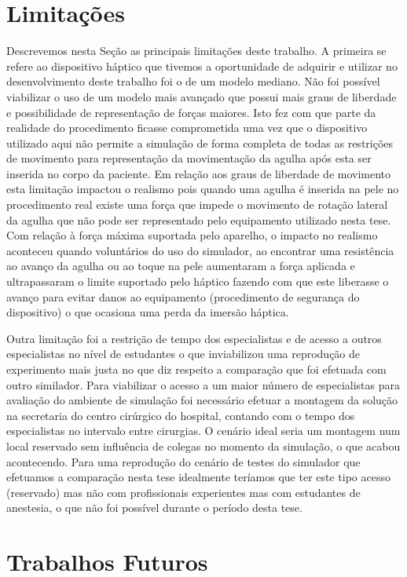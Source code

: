 \section{Limitações}

Descrevemos nesta Seção as principais limitações deste trabalho. A primeira se refere ao dispositivo háptico que tivemos a oportunidade de adquirir e utilizar no desenvolvimento deste trabalho foi o de um modelo mediano. Não foi possível viabilizar o uso de um modelo mais avançado que possui mais graus de liberdade e possibilidade de representação de forças maiores. Isto fez com que parte da realidade do procedimento ficasse comprometida uma vez que o dispositivo utilizado aqui não permite a simulação de forma completa de todas as restrições de movimento para representação da movimentação da agulha após esta ser inserida no corpo da paciente. Em relação aos graus de liberdade de movimento esta limitação impactou o realismo pois quando uma agulha é inserida na pele no procedimento real existe uma força que impede o movimento de rotação lateral da agulha que não pode ser representado pelo equipamento utilizado nesta tese. Com relação à força máxima suportada pelo aparelho, o impacto no realismo aconteceu quando voluntários do uso do simulador, ao encontrar uma resistência ao avanço da agulha ou ao toque na pele aumentaram a força aplicada e ultrapassaram o limite suportado pelo háptico fazendo com que este liberasse o avanço para evitar danos ao equipamento (procedimento de segurança do dispositivo) o que ocasiona uma perda da imersão háptica.   

Outra limitação foi a restrição de tempo dos especialistas e de acesso a outros especialistas no nível de estudantes o que inviabilizou uma reprodução de experimento mais justa no que diz respeito a comparação que foi efetuada com outro similador. Para viabilizar o acesso a um maior número de especialistas para avaliação do ambiente de simulação foi necessário efetuar a montagem da solução na secretaria do centro cirúrgico do hospital, contando com o tempo dos especialistas no intervalo entre cirurgias. O cenário ideal seria um montagem num local reservado sem influência de colegas no momento da simulação, o que acabou acontecendo. Para uma reprodução do cenário de testes do simulador que efetuamos a comparação nesta tese idealmente teríamos que ter este tipo acesso (reservado) mas não com profissionais experientes mas com estudantes de anestesia, o que não foi possível durante o período desta tese.  

\section{Trabalhos Futuros}
\label{sec:trabFuturo}


